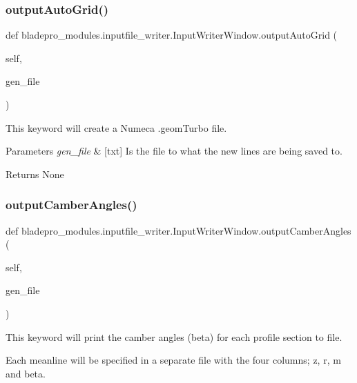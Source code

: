 \subsubsection{\texorpdfstring{output\+Auto\+Grid()}{outputAutoGrid()}}
{\footnotesize\ttfamily def bladepro\+\_\+modules.\+inputfile\+\_\+writer.\+Input\+Writer\+Window.\+output\+Auto\+Grid (\begin{DoxyParamCaption}\item[{}]{self,  }\item[{}]{gen\+\_\+file }\end{DoxyParamCaption})}



This keyword will create a Numeca .geom\+Turbo file. 


\begin{DoxyParams}{Parameters}
{\em gen\+\_\+file} & \mbox{[}txt\mbox{]} Is the file to what the new lines are being saved to. \\
\hline
\end{DoxyParams}
\begin{DoxyReturn}{Returns}
None 
\end{DoxyReturn}
\hypertarget{a00070_ab5d0d97e4bf1dd0ddf28f4f537fea598}{}\label{a00070_ab5d0d97e4bf1dd0ddf28f4f537fea598} 
\subsubsection{\texorpdfstring{output\+Camber\+Angles()}{outputCamberAngles()}}
{\footnotesize\ttfamily def bladepro\+\_\+modules.\+inputfile\+\_\+writer.\+Input\+Writer\+Window.\+output\+Camber\+Angles (\begin{DoxyParamCaption}\item[{}]{self,  }\item[{}]{gen\+\_\+file }\end{DoxyParamCaption})}



This keyword will print the camber angles (beta) for each profile section to file. 

Each meanline will be specified in a separate file with the four columns; z, r, m\textquotesingle{} and beta.

